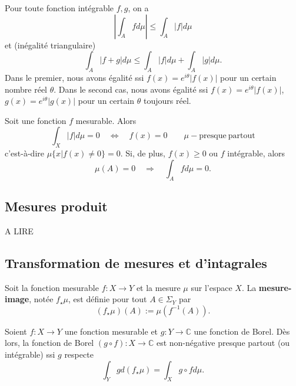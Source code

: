 \begin{lemme}
    Pour toute fonction intégrable $f,g$, on a
    \begin{equation}
        \left|\int_A f d\mu\right| \leq \int_A |f| d\mu
    \end{equation}
    et (inégalité triangulaire)
    \begin{equation}
        \int_A |f+g|d\mu \leq \int_A |f| d\mu + \int_A |g| d\mu.
    \end{equation}
    Dans le premier, nous avons égalité ssi $f(x) = e^{i\theta}|f(x)|$ pour un certain nombre réel $\theta$. Dans le second cas, nous avons égalité ssi $f(x) = e^{i\theta}|f(x)|$, $g(x) = e^{i\theta}|g(x)|$ pour un certain $\theta$ toujours réel. 
\end{lemme}

\begin{lemme}
    Soit une fonction $f$ mesurable. Alors
    \begin{equation}
        \int_X |f| d\mu = 0 \quad\Leftrightarrow\quad f(x) = 0 \qquad \mu-\mathrm{presque\ partout}
    \end{equation}
    c'est-à-dire $\mu\{x|f(x)\neq0\}=0$. Si, de plus, $f(x)\geq0$ ou $f$ intégrable, alors
    \begin{equation}
        \mu(A)=0 \quad\Rightarrow\quad \int_A f d\mu = 0.
    \end{equation}
\end{lemme}


\subsection{Mesures produit}
A LIRE

\subsection{Transformation de mesures et d'intagrales}

\begin{definition}
    Soit la fonction mesurable $f:X\to Y$ et la mesure $\mu$ sur l'espace $X$. La \textbf{mesure-image}, notée $f_\star\mu$, est définie pour tout $A\in\Sigma_Y$ par
    \begin{equation}
        (f_\star\mu)(A) := \mu(f^{-1}(A)).
    \end{equation}
\end{definition}

\begin{theo}
    Soient $f:X\to Y$ une fonction mesurable et $g:Y\to\mathbb{C}$ une fonction de Borel. Dès lors, la fonction de Borel $(g\circ f):X\to\mathbb{C}$ est non-négative presque partout (ou intégrable) ssi $g$ respecte
    \begin{equation}
        \int_Y g d(f_\star\mu) = \int_X g\circ f d\mu.
    \end{equation}
\end{theo}

